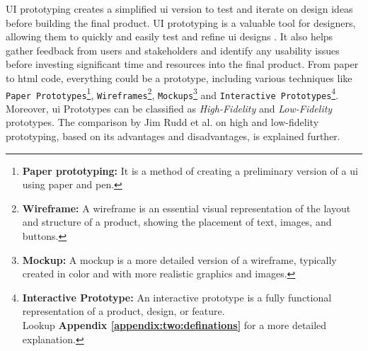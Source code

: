 UI prototyping creates a simplified \ac{ui} version to test and iterate on design ideas before building the final product.
UI prototyping is a valuable tool for designers, allowing them to quickly and easily test and refine \ac{ui} designs \cite{article:prototyping:gould}.
It also helps gather feedback from users and stakeholders \cite{misc:prorotypes:lauff} and identify any usability issues before investing significant time and resources into the final product.
From paper to \ac{html} code, everything could be a prototype, including various techniques like \texttt{Paper Prototypes}\footnote{\textbf{Paper prototyping:} It is a method of creating a preliminary version of a \ac{ui} using paper and pen.}, \texttt{Wireframes}\footnote{\textbf{Wireframe:} A wireframe is an essential visual representation of the layout and structure of a product, showing the placement of text, images, and buttons.}, \texttt{Mockups}\footnote{\textbf{Mockup:} A mockup is a more detailed version of a wireframe, typically created in color and with more realistic graphics and images.} and \texttt{Interactive Prototypes}\footnote{\textbf{Interactive Prototype:} An interactive prototype is a fully functional representation of a product, design, or feature.\\ Lookup \textbf{Appendix \ref{appendix:two:definations}} for a more detailed explanation.}.
Moreover, \ac{ui} Prototypes can be classified as \textit{High-Fidelity} and \textit{Low-Fidelity} prototypes.
The comparison by Jim Rudd et al. \cite{article:prototyping:highlowfidelity} on high and low-fidelity prototyping, based on its advantages and disadvantages, is explained further.

